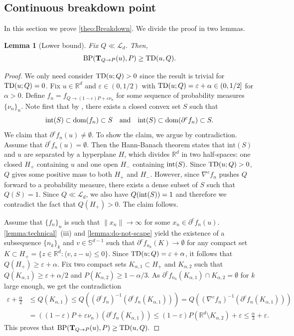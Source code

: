 \documentclass[11pt]{article}
\newcommand{\RR}{\mathbb{R}}
\newcommand{\R}{\RR}
\theoremstyle{plain}
\newtheorem{lemma}[theorem]{Lemma}
\theoremstyle{definition}\newtheorem{definition}[theorem]{Definition}
\theoremstyle{remark}
\begin{document}
\subsection{Continuous breakdown point}
In this section we prove \cref{theo:Breakdown}. We divide the proof in two  lemmas. 
\begin{lemma}[Lower bound] \label{lemma:lower-bound} Fix $Q \ll \mathcal{L}_d$. Then, 
$$ {\rm BP}({\bf T}_{Q\to P}(u), P) \geq   
{\rm TD}(u, Q). $$
\end{lemma}
\begin{proof}
%
We only need consider ${\rm TD}(u;Q)>0$ since the result is trivial for ${\rm TD}(u;Q)=0$. Fix $u\in \R^d$ and $\varepsilon\in (0,1/2)$ with ${\rm TD}(u;Q)=\varepsilon+\alpha \in (0,1/2] $ for $\alpha>0$. Define $f_{n}= f_{Q\to (1-\varepsilon)P+\varepsilon \nu_n }$ for some sequence of probability measures $\{\nu_n\}_n$.  Note first that by \cite[Theorem~3.3 and Proposition~C.4]{GangboMcCann.96}, there exists a closed convex set $S$ such that
$$ 
{\rm int}(S)\subset {\rm dom}(f_n) \subset S \quad {\rm and}\quad {\rm int}(S)\subset {\rm dom}(\partial^c f_n) \subset S.
$$ We claim that $\partial^c f_n(u)\neq \emptyset $. To show the claim, we argue by contradiction. Assume that   $\partial^c f_n(u)= \emptyset $. Then the Hann-Banach theorem states that $\mathrm{int} (S)$ and $u$ are separated by a hyperplane $H$, which divides  $\R^d$ in two half-spaces: one closed $H_+$ containing $u$ and one open $H_-$ containing ${\rm int}(S)$. Since ${\rm TD}(u;Q)>0$, $Q$ gives some positive mass to both $H_+$ and $H_-$. However, since $\nabla^c f_n$  pushes $Q$ forward to a probability measure, there exists a dense subset of $S$  such that $Q(S)=1$. Since $Q \ll \mathcal{L}_d$, we also have $Q({\rm int}(S))=1$ and therefore   we contradict the fact that $Q(H_+)>0$. The claim follows. 


Assume that  $\{f_{n}\}_n$
is such that $\|x_n\|\to \infty$ for some  $x_n\in \partial^c f_n(u) $. \cref{lemma:technical}~(iii) and \cref{lemma:do-not-scape} yield the existence of a subsequence $\{n_k\}_k$ and $v\in \mathbb{S}^{d-1}$ such that $\partial^c f_{n_k}(K) \to\emptyset$ for any  compact set $K\subset H_+= \{z\in\mathbb{R}^d: \langle v, z -u\rangle  \leq  0\} $. Since ${\rm TD}(u;Q)=\varepsilon+\alpha$,  it follows that $Q( H_+)\geq \varepsilon+\alpha$. 
Fix two compact sets $K_{\alpha,1}\subset H_+$ and $K_{\alpha,2}$ such that
$Q(K_{\alpha,1})\geq \varepsilon+\alpha/2  $
and 
$P(K_{\alpha,2})\geq 1-\alpha/3$.  As $\partial^c f_{n_k}(K_{\alpha,1})\cap K_{\alpha,2} =\emptyset $ for $k$ large enough,  we get the contradiction 
%
\begin{align*}
    \varepsilon+ \frac{\alpha}{2}&\leq Q(K_{\alpha,1}) \leq Q( (\partial^c f_n)^{-1} (\partial^c f_n(K_{\alpha,1})))=Q( (\nabla^c f_n)^{-1} (\partial^c f_n(K_{\alpha,1})))\\
    &=  ((1-\varepsilon)P+\varepsilon \nu_n)(\partial^c f_n(K_{\alpha,1}))\leq (1-\varepsilon)P(\mathbb{R}^d\setminus K_{\alpha,2})+\varepsilon \leq  \frac{\alpha}{3}  + \varepsilon .
\end{align*}
$$   $$
This proves that 
${\rm BP}({\bf T}_{Q\to P}(u), P) \geq   
{\rm TD}(u, Q). $
\end{proof}
\end{document}
